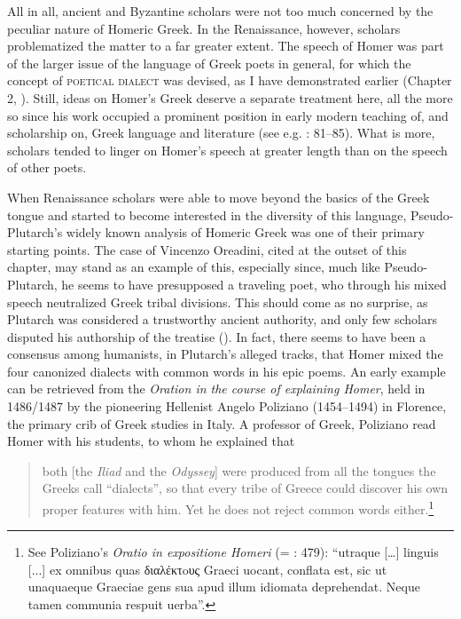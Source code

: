 All in all, ancient and Byzantine scholars were not too much concerned by the peculiar nature of Homeric Greek. In the Renaissance, however, scholars problematized the matter to a far greater extent. The speech of Homer was part of the larger issue of the language of Greek poets in general, for which the concept of \textsc{poetical} \textsc{dialect} was devised, as I have demonstrated earlier (Chapter 2, ). Still, ideas on Homer’s Greek deserve a separate treatment here, all the more so since his work occupied a prominent position in early modern teaching of, and scholarship on, Greek language and literature (see e.g. \citealt{Botley2010}: 81–85). What is more, scholars tended to linger on Homer’s speech at greater length than on the speech of other poets.

When Renaissance scholars were able to move beyond the basics of the Greek tongue and started to become interested in the diversity of this language, Pseudo-Plutarch’s widely known analysis of Homeric Greek was one of their primary starting points. The case of Vincenzo Oreadini, cited at the outset of this chapter, may stand as an example of this, especially since, much like Pseudo-Plutarch, he seems to have presupposed a traveling poet, who through his mixed speech neutralized Greek tribal divisions. This should come as no surprise, as Plutarch was considered a trustworthy ancient authority, and only few scholars disputed his authorship of the treatise (\citealt{VanRooy2018c}). In fact, there seems to have been a consensus among humanists, in Plutarch’s alleged tracks, that Homer mixed the four canonized dialects with common words in his epic poems. An early example can be retrieved from the \textit{Oration in the course of explaining Homer}, held in 1486/1487 by the pioneering Hellenist Angelo Poliziano (1454–1494) in Florence, the primary crib of Greek studies in Italy. A professor of Greek, Poliziano read Homer with his students, to whom he explained that

\begin{quote}
both [the \textit{Iliad} and the \textit{Odyssey}] were produced from all the tongues the Greeks call “dialects”, so that every tribe of Greece could discover his own proper features with him. Yet he does not reject common words either.\footnote{See Poliziano’s \textit{Oratio in expositione Homeri} (= \citealt{Poliziano1553}: 479): “utraque […] linguis [...] ex omnibus quas διαλέκτoυς Graeci uocant, conflata est, sic ut unaquaeque Graeciae gens sua apud illum idiomata deprehendat. Neque tamen communia respuit uerba”.}
\end{quote}


